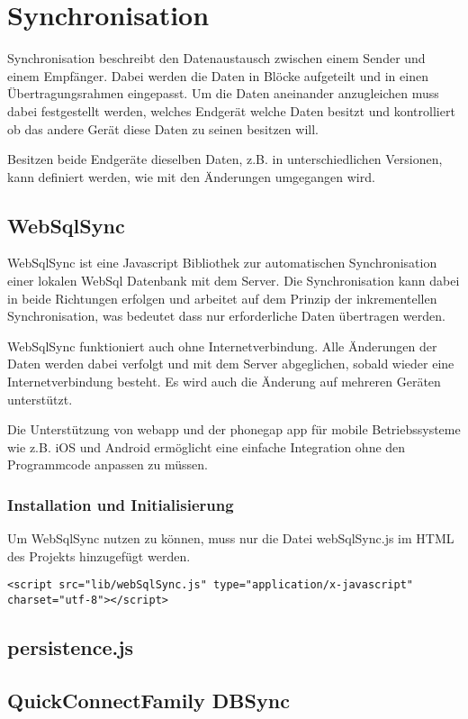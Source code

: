 %
\chapter{Synchronisation}
\label{sec:Synchronisation}


Synchronisation beschreibt den Datenaustausch zwischen einem Sender und einem Empfänger. Dabei werden die Daten in Blöcke aufgeteilt und in einen Übertragungsrahmen eingepasst. Um die Daten aneinander anzugleichen muss dabei festgestellt werden, welches Endgerät welche Daten besitzt und kontrolliert ob das andere Gerät diese Daten zu seinen besitzen will.

Besitzen beide Endgeräte dieselben Daten, z.B. in unterschiedlichen Versionen, kann definiert werden, wie mit den Änderungen umgegangen wird.\cite[]{WEB:SYNCML:2014}

\section{WebSqlSync}
\label{sec:websqlsync}

WebSqlSync ist eine Javascript Bibliothek zur automatischen Synchronisation einer lokalen WebSql Datenbank mit dem Server. Die Synchronisation kann dabei in beide Richtungen erfolgen und arbeitet auf dem Prinzip der inkrementellen Synchronisation, was bedeutet dass nur erforderliche Daten übertragen werden.

WebSqlSync funktioniert auch ohne Internetverbindung. Alle Änderungen der Daten werden dabei verfolgt und mit dem Server abgeglichen, sobald wieder eine Internetverbindung besteht. Es wird auch die Änderung auf mehreren Geräten unterstützt.

Die Unterstützung von webapp und der phonegap app für mobile Betriebssysteme wie z.B. iOS und Android ermöglicht eine einfache Integration ohne den Programmcode anpassen zu müssen.\cite[]{WEB:WEBSQLSYNC:2014}

\cleardoublepage

\subsection{Installation und Initialisierung}
\label{sec:installation}

Um WebSqlSync nutzen zu können, muss nur die Datei webSqlSync.js im \ac{HTML} des Projekts hinzugefügt werden.

\lstset{language=html}
\lstinline$<script src="lib/webSqlSync.js" type="application/x-javascript" charset="utf-8"></script>$



\section{persistence.js}
\label{sec:persistence}

\section{QuickConnectFamily DBSync}
\label{sec:quickconnect}